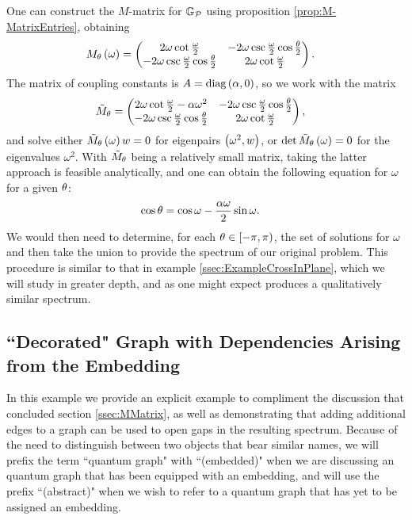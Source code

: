 One can construct the $M$-matrix for $\mathbb{G}_{\mathcal{P}}$ using proposition \ref{prop:M-MatrixEntries}, obtaining
\begin{align*}
	M_{\theta}\left( \omega \right) &= 
	\begin{pmatrix} 
		2\omega\cot\frac{\omega}{2} & -2\omega\csc\frac{\omega}{2}\cos\frac{\theta}{2} \\
		-2\omega\csc\frac{\omega}{2}\cos\frac{\theta}{2} & 2\omega\cot\frac{\omega}{2}
	\end{pmatrix}.
\end{align*}
The matrix of coupling constants is $A = \mathrm{diag}\left( \alpha, 0 \right)$, so we work with the matrix
\begin{align*}
	\tilde{M}_\theta &= 
	\begin{pmatrix}
		2\omega\cot\frac{\omega}{2} - \alpha\omega^2 & -2\omega\csc\frac{\omega}{2}\cos\frac{\theta}{2} \\
		-2\omega\csc\frac{\omega}{2}\cos\frac{\theta}{2} & 2\omega\cot\frac{\omega}{2}		
	\end{pmatrix},
\end{align*}
and solve either $\tilde{M}_\theta\left( \omega \right) w = 0$ for eigenpairs $\left( \omega^2, w \right)$, or $\det\tilde{M}_\theta \left( \omega \right) = 0$ for the eigenvalues $\omega^2$.
With $\tilde{M}_\theta$ being a relatively small matrix, taking the latter approach is feasible analytically, and one can obtain the following equation for $\omega$ for a given $\theta$:
\begin{align*}
	\cos\theta &= \cos\omega - \frac{\alpha\omega}{2}\sin\omega.
\end{align*}
We would then need to determine, for each $\theta\in\left[-\pi, \pi\right)$, the set of solutions for $\omega$ and then take the union to provide the spectrum of our original problem.
This procedure is similar to that in example \ref{ssec:ExampleCrossInPlane}, which we will study in greater depth, and as one might expect produces a qualitatively similar spectrum.

\subsection{``Decorated" Graph with Dependencies Arising from the Embedding} \label{ssec:EmbeddingDependentExample}
In this example we provide an explicit example to compliment the discussion that concluded section \ref{ssec:MMatrix}, as well as demonstrating that adding additional edges to a graph can be used to open gaps in the resulting spectrum.
Because of the need to distinguish between two objects that bear similar names, we will prefix the term ``quantum graph" with ``(embedded)" when we are discussing an quantum graph that has been equipped with an embedding, and will use the prefix ``(abstract)" when we wish to refer to a quantum graph that has yet to be assigned an embedding. \newline

